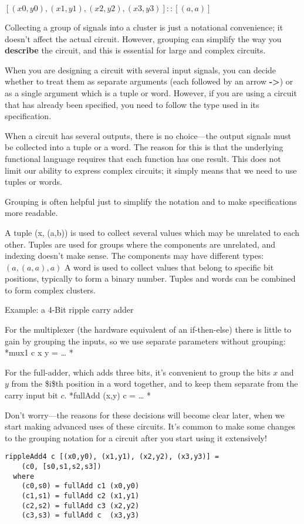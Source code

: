 \documentclass[11pt]{article}
\begin{document}
\([(x0,y0), (x1,y1), (x2,y2), (x3,y3)] :: [(a,a)]\)

Collecting a group of signals into a cluster is just a notational
convenience; it doesn't affect the actual circuit.  However, grouping
can simplify the way you \textbf{describe} the circuit, and this is essential
for large and complex circuits.

When you are designing a circuit with several input signals, you can
decide whether to treat them as separate arguments (each followed by
an arrow \textbf{->}) or as a single argument which is a tuple or word.
However, if you are using a circuit that has already been specified,
you need to follow the type used in its specification.

When a circuit has several outputs, there is no choice---the output
signals must be collected into a tuple or a word.  The reason for this
is that the underlying functional language requires that each function
has one result.  This does not limit our ability to express complex
circuits; it simply means that we need to use tuples or words.

Grouping is often helpful just to simplify the notation and to make
specifications more readable.

A tuple (x, (a,b)) is used to collect several values which may be
unrelated to each other.  Tuples are used for groups where the
components are unrelated, and indexing doesn't make sense.  The
components may have different types: \((a, (a,a), a)\) A word is used to
collect values that belong to specific bit positions, typically to
form a binary number.  Tuples and words can be combined to form
complex clusters.

Example: a 4-Bit ripple carry adder

For the multiplexer (the hardware equivalent of an if-then-else)
there is little to gain by grouping the inputs, so we use separate
parameters without grouping: *mux1 c x y = \ldots{} *

For the full-adder, which adds three bits, it's convenient to
group the bits \(x\) and \(y\) from the \$i\$th position in a word together,
and to keep them separate from the carry input bit \(c\).
  *fullAdd (x,y) c = \ldots{} *

Don't worry---the reasons for these decisions will become clear later,
when we start making advanced uses of these circuits.  It's common to
make some changes to the grouping notation for a circuit after you
start using it extensively!

\begin{verbatim}
rippleAdd4 c [(x0,y0), (x1,y1), (x2,y2), (x3,y3)] =
    (c0, [s0,s1,s2,s3])
  where
    (c0,s0) = fullAdd c1 (x0,y0)
    (c1,s1) = fullAdd c2 (x1,y1)
    (c2,s2) = fullAdd c3 (x2,y2)
    (c3,s3) = fullAdd c  (x3,y3)
\end{verbatim}
\end{document}
